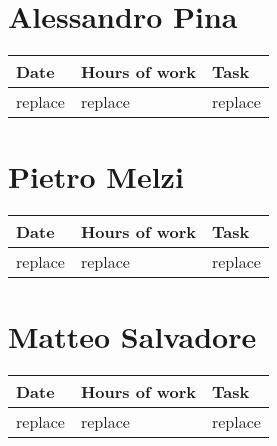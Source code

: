 \section{Alessandro Pina}
\begin{table}[H]
	\begin{tabular}{ p{2cm} p{3cm} p{5cm}}
	Date & Hours of work & Task\\
	\hline
	replace  & replace & replace \\
	\end{tabular}
\end{table}

\section{Pietro Melzi}
\begin{table}[H]
	\begin{tabular}{ p{2cm} p{3cm} p{5cm}}
	Date & Hours of work & Task\\
	\hline
	replace  & replace & replace \\
	\end{tabular}
\end{table}

\section{Matteo Salvadore}
\begin{table}[H]
	\begin{tabular}{ p{2cm} p{3cm} p{5cm}}
	Date & Hours of work & Task\\
	\hline
	replace  & replace & replace \\
	\end{tabular}
\end{table}